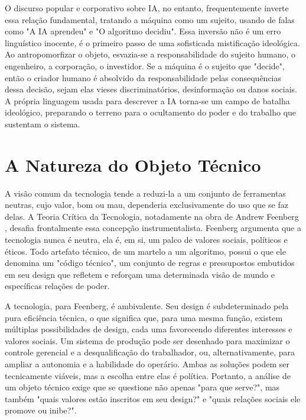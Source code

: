 O discurso popular e corporativo sobre IA, no entanto, frequentemente inverte essa relação fundamental, tratando a máquina como um sujeito, usando de falas como 
"A IA aprendeu" e "O algoritmo decidiu". 
Essa inversão não é um erro linguístico inocente, é o primeiro passo de uma sofisticada mistificação ideológica. 
Ao antropomorfizar o 
objeto, esvazia-se a responsabilidade do sujeito humano, o engenheiro, a corporação, o investidor. 
Se a máquina é o sujeito que "decide", então o criador humano é absolvido da 
responsabilidade pelas consequências dessa decisão, sejam elas vieses discriminatórios, desinformação ou danos sociais. 
A própria linguagem usada para descrever a IA torna-se 
um campo de batalha ideológico, preparando o terreno para o ocultamento do poder e do trabalho que sustentam o sistema. 

\section{A Natureza do Objeto Técnico}\label{sec:natureza_obj_tec}

A visão comum da tecnologia tende a reduzi-la a um conjunto de ferramentas neutras, cujo valor, bom ou mau, dependeria exclusivamente do uso que se faz delas. 
A Teoria Crítica 
da Tecnologia, notadamente na obra de Andrew Feenberg \cite{Feenberg1999}, desafia frontalmente essa concepção instrumentalista. 
Feenberg argumenta que a tecnologia nunca é neutra, ela é, em si, 
um palco de valores sociais, políticos e éticos. 
Todo artefato técnico, de um martelo a um algoritmo, possui o que ele denomina um "código técnico", um conjunto de regras e 
pressupostos embutidos em seu design que refletem e reforçam uma determinada visão de mundo e específicas relações de poder. 

A tecnologia, para Feenberg, é ambivalente. Seu design é subdeterminado pela pura eficiência técnica, o que significa que, para uma mesma função, existem múltiplas possibilidades 
de design, cada uma favorecendo diferentes interesses e valores sociais. 
Um sistema de produção pode ser desenhado para maximizar o controle gerencial e a desqualificação do 
trabalhador, ou, alternativamente, para ampliar a autonomia e a habilidade do operário. 
Ambas as soluções podem ser tecnicamente viáveis, mas a escolha entre elas é política. 
Portanto, a análise de um objeto técnico exige que se questione não apenas "para que serve?", mas também "quais valores estão inscritos em seu design?" 
e "quais relações sociais 
ele promove ou inibe?". 

